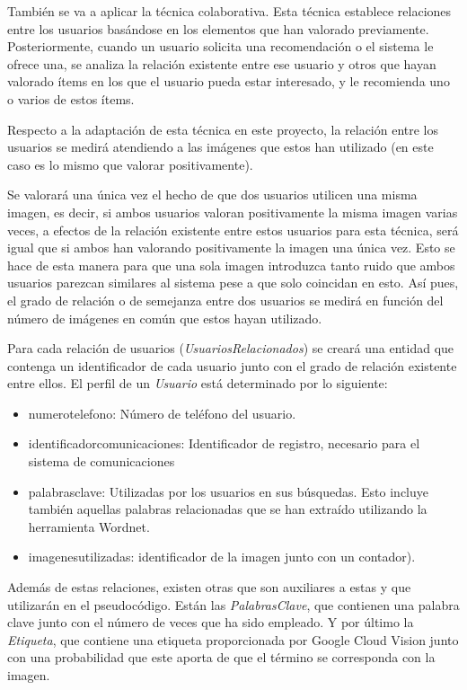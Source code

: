 También se va a aplicar la técnica colaborativa. Esta técnica establece relaciones entre los usuarios basándose en los elementos que han valorado previamente. Posteriormente, cuando un usuario solicita una recomendación o el sistema le ofrece una, se analiza la relación existente entre ese usuario y otros que hayan valorado ítems en los que el usuario pueda estar interesado, y le recomienda uno o varios de estos ítems.

Respecto a la adaptación de esta técnica en este proyecto, la relación entre los usuarios se medirá atendiendo a las imágenes que estos han utilizado (en este caso es lo mismo que valorar positivamente). 

Se valorará una única vez el hecho de que dos usuarios utilicen una misma imagen, es decir, si ambos usuarios valoran positivamente la misma imagen varias veces, a efectos de la relación existente entre estos usuarios para esta técnica, será igual que si ambos han valorando positivamente la imagen una única vez. Esto se hace de esta manera para que una sola imagen introduzca tanto ruido que ambos usuarios parezcan similares al sistema pese a que solo coincidan en esto. Así pues, el grado de relación o de semejanza entre dos usuarios se medirá en función del número de imágenes en común que estos hayan utilizado.

Para cada relación de usuarios (\textit{UsuariosRelacionados}) se creará una entidad que contenga un identificador de cada usuario junto con el grado de relación existente entre ellos. El perfil de un \textit{Usuario} está determinado por lo siguiente:

\begin{itemize}
\item numero\textunderscore telefono: Número de teléfono del usuario.
\item identificador\textunderscore comunicaciones: Identificador de registro, necesario para el sistema de comunicaciones
\item palabras\textunderscore clave: Utilizadas por los usuarios en sus búsquedas. Esto incluye también aquellas palabras relacionadas que se han extraído utilizando la herramienta Wordnet.
\item imagenes\textunderscore utilizadas: identificador de la imagen junto con un contador).
\end{itemize}

Además de estas relaciones, existen otras que son auxiliares a estas y que utilizarán en el pseudocódigo. Están las \textit{PalabrasClave}, que contienen una palabra clave junto con el número de veces que ha sido empleado. Y por último la \textit{Etiqueta}, que contiene una etiqueta proporcionada por Google Cloud Vision junto con una probabilidad que este aporta de que el término se corresponda con la imagen. 


